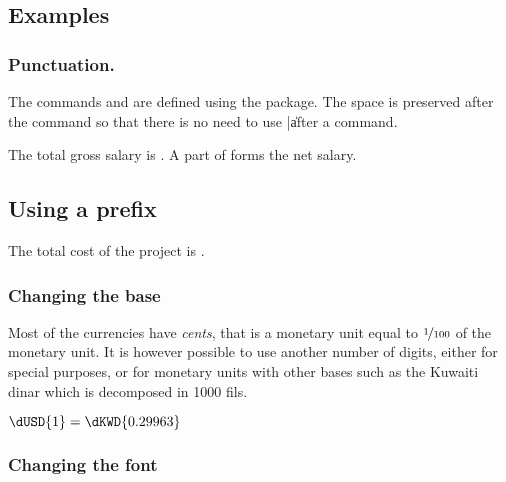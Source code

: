 \documentclass[12pt,add-index]{cnltx-doc}
\begin{document}
\subsection{Examples}

\subsubsection{Punctuation.}

The commands  and  are defined using 
the  package. The space is preserved after the command
so that there is no need to use \verbcode|\| after a command.

\begin{example}
    The total gross salary is . A part of  forms the net salary.
\end{example}

\subsection*{Using a prefix}

\begin{example}
    The total cost of the project is .
\end{example}

\subsubsection{Changing the base}

Most of the currencies have \emph{cents}, that is a monetary unit equal to $\nicefrac{1}{100}$ 
of the monetary unit. It is however possible to use another number of digits, either 
for special purposes, or for monetary units with other bases such as the Kuwaiti dinar
which is decomposed in \num{1000} fils.

\begin{example}
    $\dUSD{1}=\dKWD{0.29963}$
\end{example}

\subsubsection{Changing the font}
\end{document}
